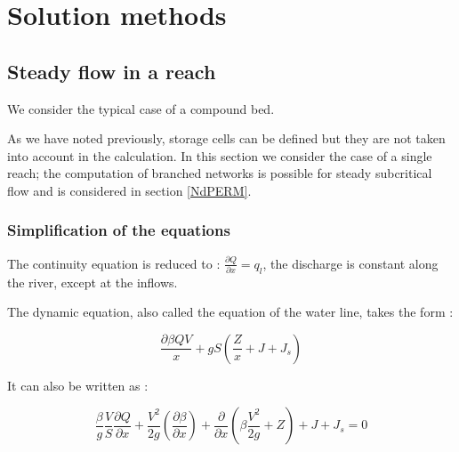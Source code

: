 \section{Solution methods} \label{MR}

\subsection{Steady flow in a reach}

We consider the typical case of a compound bed.

As we have noted previously, storage cells can be defined but they are not taken into account in the calculation. In this section we consider the case of a single reach; the computation of branched networks is possible for steady subcritical flow and is considered in section \ref{NdPERM}.

\subsubsection{Simplification of the equations}

The continuity equation is reduced to : $\frac{\partial Q}{\partial x}=q_l$, the discharge is constant along the river, except at the inflows.

The dynamic equation, also called the equation of the water line, takes the form :

\begin{equation}
  \frac{\partial \beta Q V}{x} + g S \left ( \frac{Z}{x} +J + J_s \right )
\end{equation}

It can also be written as :

\begin{equation}
  \frac{\beta}{g} \frac{V}{S} \frac{\partial Q}{\partial x} + \frac{V^2}{2 g} \left ( \frac{\partial \beta}{\partial x} \right ) + \frac{\partial}{\partial x} \left ( \beta \frac{V^2}{2 g} + Z \right ) + J + J_s = 0
\end{equation}

